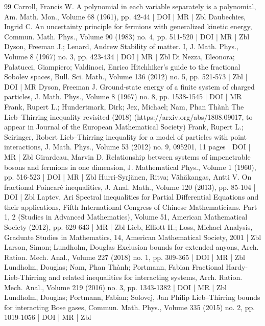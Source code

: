 \documentclass[10pt]{amsart}
\theoremstyle{definition}\newtheorem{defi}[theo]{Definition}\newtheorem{rema}[theo]{Remark}\newtheorem{exam}[theo]{Example}\newtheorem{exem}[theo]{Example}\newtheorem{nota}[theo]{Notation}
\newcommand\1{{\ensuremath {\mathds 1} }}
\begin{document}
\begin{thebibliography}{99}
Carroll, Francis W. A polynomial in each variable separately is a polynomial, Am. Math. Mon., Volume 68 (1961), pp. 42-44 | DOI | MR | Zbl
Daubechies, Ingrid C. An uncertainty principle for fermions with generalized kinetic energy, Commun. Math. Phys., Volume 90 (1983) no. 4, pp. 511-520 | DOI | MR | Zbl
Dyson, Freeman J.; Lenard, Andrew Stability of matter. I, J. Math. Phys., Volume 8 (1967) no. 3, pp. 423-434 | DOI | MR | Zbl
Di Nezza, Eleonora; Palatucci, Giampiero; Valdinoci, Enrico Hitchhiker’s guide to the fractional Sobolev spaces, Bull. Sci. Math., Volume 136 (2012) no. 5, pp. 521-573 | Zbl | DOI | MR
Dyson, Freeman J. Ground-state energy of a finite system of charged particles, J. Math. Phys., Volume 8 (1967) no. 8, pp. 1538-1545 | DOI | MR
Frank, Rupert L.; Hundertmark, Dirk; Jex, Michael; Nam, Phan Thành The Lieb–Thirring inequality revisited (2018) (https://arxiv.org/abs/1808.09017, to appear in Journal of the European Mathematical Society)
Frank, Rupert L.; Seiringer, Robert Lieb–Thirring inequality for a model of particles with point interactions, J. Math. Phys., Volume 53 (2012) no. 9, 095201, 11 pages | DOI | MR | Zbl
Girardeau, Marvin D. Relationship between systems of impenetrable bosons and fermions in one dimension, J. Mathematical Phys., Volume 1 (1960), pp. 516-523 | DOI | MR | Zbl
Hurri-Syrjänen, Ritva; Vähäkangas, Antti V. On fractional Poincaré inequalities, J. Anal. Math., Volume 120 (2013), pp. 85-104 | DOI | Zbl
Laptev, Ari Spectral inequalities for Partial Differential Equations and their applications, Fifth International Congress of Chinese Mathematicians. Part 1, 2 (Studies in Advanced Mathematics), Volume 51, American Mathematical Society (2012), pp. 629-643 | MR | Zbl
Lieb, Elliott H.; Loss, Michael Analysis, Graduate Studies in Mathematics, 14, American Mathematical Society, 2001 | Zbl
Larson, Simon; Lundholm, Douglas Exclusion bounds for extended anyons, Arch. Ration. Mech. Anal., Volume 227 (2018) no. 1, pp. 309-365 | DOI | MR | Zbl
Lundholm, Douglas; Nam, Phan Thành; Portmann, Fabian Fractional Hardy-Lieb-Thirring and related inequalities for interacting systems, Arch. Ration. Mech. Anal., Volume 219 (2016) no. 3, pp. 1343-1382 | DOI | MR | Zbl
Lundholm, Douglas; Portmann, Fabian; Solovej, Jan Philip Lieb–Thirring bounds for interacting Bose gases, Commun. Math. Phys., Volume 335 (2015) no. 2, pp. 1019-1056 | DOI | MR | Zbl

\end{thebibliography}
\end{document}
